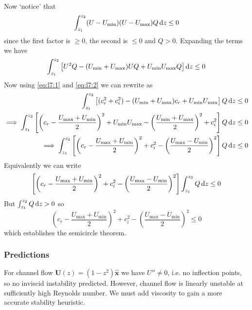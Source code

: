 \documentclass{jknotes}
\newcommand{\zint}{\int_{z_1}^{z_2}}
\begin{document}
Now `notice' that
\begin{equation}
	\zint (U-U_{\min})(U-U_{\max})Q\, \diffd z \le 0
\end{equation}
since the first factor is $\ge 0$, the second is $\le 0$ and $Q > 0$.
Expanding the terms we have
\begin{equation}
	\zint \left[ U^2 Q - (U_{\min} + U_{\max}) UQ + U_{\min} U_{\max} Q
	\right]\diffd z \le 0
\end{equation}
Now using \eqref{eq:l7:1} and \eqref{eq:l7:2} we can rewrite as
\begin{align}
	\zint \left[ (c_r^2+c_i^2) - (U_{\min} + U_{\max})c_r +
	U_{\min}U_{\max}\right] Q \,\diffd z &\le 0 \\
	\implies \zint \left[ \left(c_r - \frac{U_{\max} + U_{\min}}{2}\right)^2  +
	 U_{\min}U_{\max} - \left(\frac{U_{\min}+U_{\max}}{2}\right)^2 +
	c_i^2\right] Q \,\diffd z &\le 0 \\
	\implies \zint \left[ \left(c_r - \frac{U_{\max} + U_{\min}}{2}\right)^2  +
	c_i^2 - \left(\frac{U_{\max}-U_{\min}}{2}\right)^2\right] Q \,\diffd z &\le 0
\end{align}
Equivalently we can write
\begin{equation}
	\left[ \left(c_r - \frac{U_{\max} + U_{\min}}{2}\right)^2  +
	c_i^2 - \left(\frac{U_{\max}-U_{\min}}{2}\right)^2\right] \zint Q \,\diffd
	z  \le 0
\end{equation}
But $\zint Q \, \diffd z > 0$ so
\begin{equation}
	\left(c_r - \frac{U_{\max} + U_{\min}}{2}\right)^2  +
	c_i^2 - \left(\frac{U_{\max}-U_{\min}}{2}\right)^2 \le 0
\end{equation}
which establishes the semicircle theorem.

\subsubsection{Predictions}
For channel flow $\symbf{U}(z) = (1-z^2)\hat{\symbf{x}}$ we have $U'' \ne 0$,
i.e. no inflection points, so no inviscid instability predicted. However,
channel flow is linearly unstable at sufficiently high Reynolds number. We
must add viscosity to gain a more accurate stability heuristic.
\end{document}
